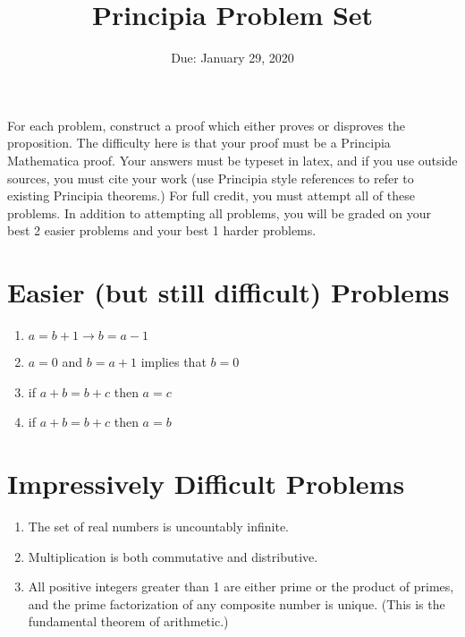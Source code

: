 \documentclass{article}
\title{Principia Problem Set}
\date{Due: January 29, 2020}
\begin{document}
\maketitle

For each problem, construct a proof which either proves or disproves
the proposition.  The difficulty here is that your proof must be
a Principia Mathematica proof. Your answers must be typeset in latex,
and if you use outside sources, you must cite your work (use Principia
style references to refer to existing Principia theorems.)  For full
credit, you must attempt all of these problems.  In addition to
attempting all problems, you will be graded on your best 2 easier
problems and your best 1 harder problems.  


\section{Easier (but still difficult) Problems}
\begin{enumerate}
    \item $a=b+1 \rightarrow b = a-1$
    \item $a=0$ and $b=a+1$ implies that $b=0$
    \item if $a+b = b+c$ then $a=c$
    \item if $a+b = b+c$ then $a=b$
\end{enumerate}

\section{Impressively Difficult Problems}
\begin{enumerate}
    \item The set of real numbers is uncountably infinite.
    \item Multiplication is both commutative and distributive.
    \item All positive integers greater than 1 are either prime or
        the product of primes, and the prime factorization of any
        composite number is unique. (This is the fundamental theorem of
        arithmetic.)
\end{enumerate}
\end{document}
